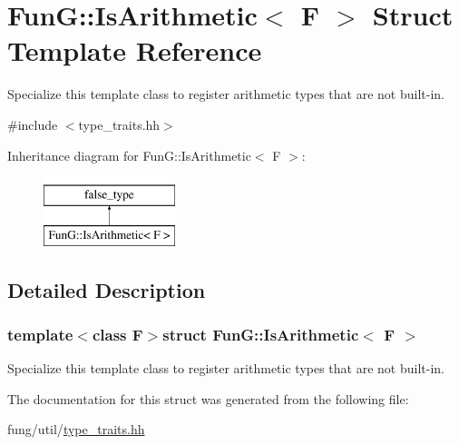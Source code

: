 \hypertarget{structFunG_1_1IsArithmetic}{}\section{Fun\+G\+:\+:Is\+Arithmetic$<$ F $>$ Struct Template Reference}
\label{structFunG_1_1IsArithmetic}


Specialize this template class to register arithmetic types that are not built-\/in.  




{\ttfamily \#include $<$type\+\_\+traits.\+hh$>$}

Inheritance diagram for Fun\+G\+:\+:Is\+Arithmetic$<$ F $>$\+:\begin{figure}[H]
\begin{center}
\leavevmode
\includegraphics[height=2.000000cm]{structFunG_1_1IsArithmetic}
\end{center}
\end{figure}


\subsection{Detailed Description}
\subsubsection*{template$<$class F$>$struct Fun\+G\+::\+Is\+Arithmetic$<$ F $>$}

Specialize this template class to register arithmetic types that are not built-\/in. 

The documentation for this struct was generated from the following file\+:\begin{DoxyCompactItemize}
\item 
fung/util/\hyperlink{type__traits_8hh}{type\+\_\+traits.\+hh}\end{DoxyCompactItemize}
